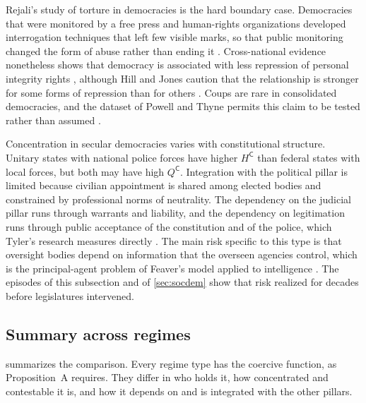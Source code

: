 \documentclass[11pt,letterpaper]{article}
\theoremstyle{definition}
\theoremstyle{remark}
\newcommand{\pC}{\mathsf{C}}
\begin{document}
Rejali's study of torture in democracies is the hard boundary case. Democracies that were monitored by a free press and human-rights organizations developed interrogation techniques that left few visible marks, so that public monitoring changed the form of abuse rather than ending it \citep{rejali2007}. Cross-national evidence nonetheless shows that democracy is associated with less repression of personal integrity rights \citep{poe1994}, although Hill and Jones caution that the relationship is stronger for some forms of repression than for others \citep{hill2014}. Coups are rare in consolidated democracies, and the dataset of Powell and Thyne permits this claim to be tested rather than assumed \citep{powell2011}.

Concentration in secular democracies varies with constitutional structure. Unitary states with national police forces have higher $H^{\pC}$ than federal states with local forces, but both may have high $Q^{\pC}$. Integration with the political pillar is limited because civilian appointment is shared among elected bodies and constrained by professional norms of neutrality. The dependency on the judicial pillar runs through warrants and liability, and the dependency on legitimation runs through public acceptance of the constitution and of the police, which Tyler's research measures directly \citep{tyler1990}. The main risk specific to this type is that oversight bodies depend on information that the overseen agencies control, which is the principal-agent problem of Feaver's model applied to intelligence \citep{feaver2003}. The episodes of this subsection and of \cref{sec:socdem} show that risk realized for decades before legislatures intervened.

\subsection{Summary across regimes}

 summarizes the comparison. Every regime type has the coercive function, as Proposition~A requires. They differ in who holds it, how concentrated and contestable it is, and how it depends on and is integrated with the other pillars.
\end{document}

